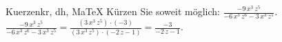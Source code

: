 \begin{MAufgabe}{Kuerzen}{kr, dh, MaTeX}
K\"urzen Sie soweit m\"oglich: $\frac{- 9\, x^3\, z^5}{ - 6\, x^3\, z^6 - 3\, x^3\, z^5}$.\\ 
\ifLsg\MLoesung
\quad $\frac{- 9\, x^3\, z^5}{ - 6\, x^3\, z^6 - 3\, x^3\, z^5}=\frac{(3\, x^3\, z^5)\cdot(-3)}{(3\, x^3\, z^5)\cdot( - 2\, z - 1)}=\frac{-3}{ - 2\, z - 1}$.\else\relax\fi
 \end{MAufgabe}